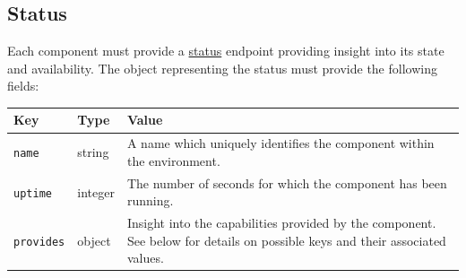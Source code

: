 \documentclass[11pt,letterpaper]{article}
\begin{document}
\subsection{Status}
\label{formats-status}

Each component must provide a \hyperref[endpoints-common]{status} endpoint
providing insight into its state and availability. The object representing the
status must provide the following fields:

\begin{tabulary}{\textwidth}{ | l | l | L | }
    \hline
    \textbf{Key} & \textbf{Type} & \textbf{Value} \\
    \hline
    \texttt{name} & string & A name which uniquely identifies the component
        within the environment. \\
    \hline
    \texttt{uptime} & integer & The number of seconds for which the component
        has been running. \\
    \hline
    \texttt{provides} & object & Insight into the capabilities provided by the
        component. See below for details on possible keys and their associated
        values. \\
    \hline
\end{tabulary}
\end{document}
